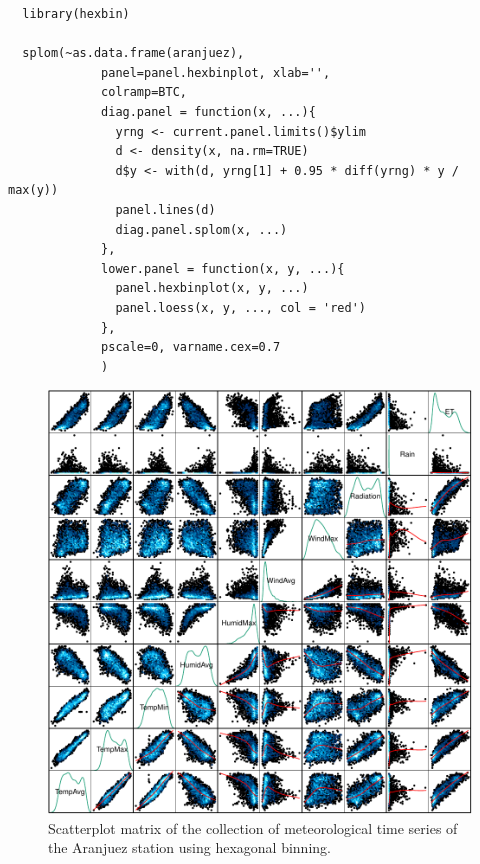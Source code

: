 \documentclass[smallroyalvopaper]{memoir}
\begin{document}

\lstset{language=R,label= ,caption= ,captionpos=b,numbers=none}
\begin{lstlisting}
  library(hexbin)
  
  splom(~as.data.frame(aranjuez),
             panel=panel.hexbinplot, xlab='',
             colramp=BTC,
             diag.panel = function(x, ...){
               yrng <- current.panel.limits()$ylim
               d <- density(x, na.rm=TRUE)
               d$y <- with(d, yrng[1] + 0.95 * diff(yrng) * y / max(y))
               panel.lines(d)
               diag.panel.splom(x, ...)
             },
             lower.panel = function(x, y, ...){
               panel.hexbinplot(x, y, ...)
               panel.loess(x, y, ..., col = 'red')
             },
             pscale=0, varname.cex=0.7
             )
\end{lstlisting}

\begin{figure}[htb]
\centering
\includegraphics[width=.9\linewidth]{figs/aranjuezSplomHexbin.pdf}
\caption{\label{fig:orgparagraph2}
Scatterplot matrix of the collection of meteorological time series of the Aranjuez station using hexagonal binning.}
\end{figure}
\end{document}
